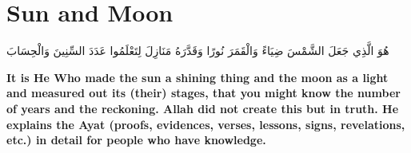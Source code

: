 \chapter{Sun and Moon}
\begin{center}
    {\Huge    
        \begin{Arabic}
            هُوَ الَّذِي جَعَلَ الشَّمْسَ ضِيَاءً وَالْقَمَرَ نُورًا وَقَدَّرَهُ مَنَازِلَ لِتَعْلَمُوا عَدَدَ السِّنِينَ وَالْحِسَابَ
        \end{Arabic}
    }    
\end{center}
\vspace*{\fill}
\vspace{3cm}
\begin{center}
    \large \textbf{It is He Who made the sun a shining thing and the moon as a light and measured out its (their) stages, that you might know the number of years and the reckoning. Allah did not create this but in truth. He explains the Ayat (proofs, evidences, verses, lessons, signs, revelations, etc.) in detail for people who have knowledge.}
\end{center}
